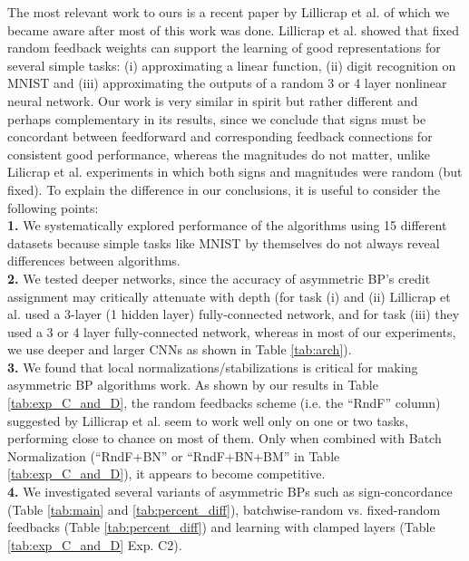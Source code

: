 \documentclass[letterpaper]{article}
\begin{document}
The most relevant work to ours is a recent paper by Lillicrap et al. \cite{lillicrap2014random} of which we became aware after most of this work was done. Lillicrap et al. showed that fixed random feedback weights can support the learning of good representations for several simple tasks: (i) approximating a linear function, (ii) digit recognition on MNIST and (iii) approximating the outputs of a random 3 or 4 layer nonlinear neural network. Our work is very similar in spirit but rather different and perhaps complementary in its results, since we conclude that signs must be concordant between feedforward and corresponding feedback connections for consistent good performance, whereas the magnitudes do not matter, unlike Lilicrap et al. experiments in which both signs and magnitudes were random (but fixed). To explain the difference in our conclusions, it is useful to consider the following points: \\
\textbf{1.}  We systematically explored performance of the algorithms using 15 different datasets because simple tasks like MNIST by themselves do not always reveal differences between algorithms. \\
\textbf{2.} We tested deeper networks, since the accuracy of asymmetric BP's credit assignment may critically attenuate with depth (for task (i) and (ii) Lillicrap et al. used a 3-layer (1 hidden layer) fully-connected network, and for task (iii) they used a 3 or 4 layer fully-connected network, whereas in most of our experiments, we use deeper and larger CNNs as shown in Table \ref{tab:arch}).\\
\textbf{3.}  We found that local normalizations/stabilizations is critical for making  asymmetric BP algorithms work. As shown by our results in Table \ref{tab:exp_C_and_D}, the random feedbacks scheme (i.e. the ``RndF'' column) suggested by Lillicrap et al. seem to work well only on one or two tasks, performing close to chance on most of them. Only when combined with Batch Normalization (``RndF+BN'' or ``RndF+BN+BM'' in Table \ref{tab:exp_C_and_D}), it appears to become competitive.\\
\textbf{4.}  We investigated several variants of asymmetric BPs such as sign-concordance (Table \ref{tab:main} and \ref{tab:percent_diff}), batchwise-random vs. fixed-random feedbacks (Table \ref{tab:percent_diff}) and learning with clamped layers (Table \ref{tab:exp_C_and_D} Exp. C2).


\newcommand{\tdG}[1]{\textcolor{dG}{\textbf{#1}}}
\newcommand{\tdR}[1]{\textcolor{dR}{\textbf{#1}}}
\newcommand{\mc}[2]{\multicolumn{#1}{c}{#2}}
\end{document}
